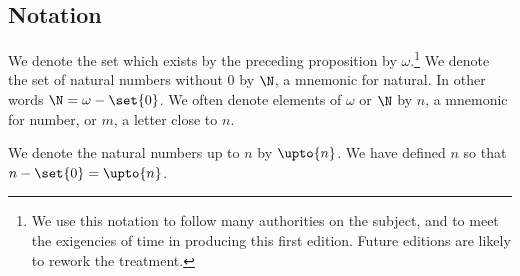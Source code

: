 \subsection*{Notation}


%    

We denote the set which exists by the preceding proposition by $\omega $.\footnote{We use this notation to follow many authorities on the subject, and to meet the exigencies of time in producing this first edition. Future editions are likely to rework the treatment.}
We denote the set of natural numbers without 0 by $\N  $, a mnemonic for natural.
In other words $\N   = \omega  - \set{0}$.
We often denote elements of $\omega $ or $\N  $ by $n$, a mnemonic for number, or $m$, a letter close to $n$.

We denote the natural numbers up to $n$ by $\upto{n}$.
We have defined $n$ so that $n - \set{0} = \upto{n}$.

